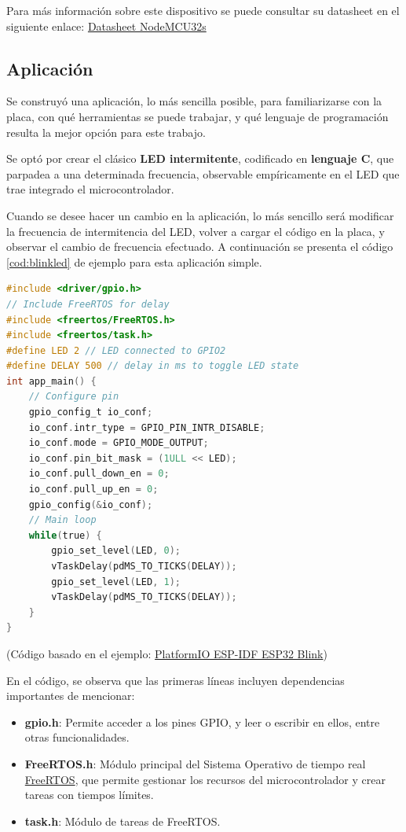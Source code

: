 Para más información sobre este dispositivo se puede consultar su datasheet en el siguiente enlace: \href{https://docs.ai-thinker.com/_media/esp32/docs/nodemcu-32s_product_specification.pdf}{Datasheet NodeMCU32s}

\subsection{Aplicación}
Se construyó una aplicación, lo más sencilla posible, para familiarizarse con la placa, con qué herramientas se puede trabajar, y qué lenguaje de programación resulta la mejor opción para este trabajo.

Se optó por crear el clásico \textbf{LED intermitente}, codificado en \textbf{lenguaje C}, que parpadea a una determinada frecuencia, observable empíricamente en el LED que trae integrado el microcontrolador. 

Cuando se desee hacer un cambio en la aplicación, lo más sencillo será modificar la frecuencia de intermitencia del LED, volver a cargar el código en la placa, y observar el cambio de frecuencia efectuado. A continuación se presenta el código \ref{cod:blinkled} de ejemplo para esta aplicación simple.

\newpage
\begin{lstlisting}[language=C, caption={BlinkLED}, label={cod:blinkled}, captionpos=b]
#include <driver/gpio.h>
// Include FreeRTOS for delay
#include <freertos/FreeRTOS.h>
#include <freertos/task.h>
#define LED 2 // LED connected to GPIO2
#define DELAY 500 // delay in ms to toggle LED state
int app_main() {
    // Configure pin
    gpio_config_t io_conf;
    io_conf.intr_type = GPIO_PIN_INTR_DISABLE;
    io_conf.mode = GPIO_MODE_OUTPUT;
    io_conf.pin_bit_mask = (1ULL << LED);
    io_conf.pull_down_en = 0;
    io_conf.pull_up_en = 0;
    gpio_config(&io_conf);
    // Main loop
    while(true) {
        gpio_set_level(LED, 0);
        vTaskDelay(pdMS_TO_TICKS(DELAY));
        gpio_set_level(LED, 1);
        vTaskDelay(pdMS_TO_TICKS(DELAY));
    }
}
\end{lstlisting}
(Código basado en el ejemplo: \href{https://techoverflow.net/2020/04/09/platformio-esp-idf-esp32-blink-example/}{PlatformIO ESP-IDF ESP32 Blink})

En el código, se observa que las primeras líneas incluyen dependencias importantes de mencionar:
\begin{itemize}
\item \textbf{gpio.h}: Permite acceder a los pines GPIO, y leer o escribir en ellos, entre otras funcionalidades.
\item \textbf{FreeRTOS.h}: Módulo principal del Sistema Operativo de tiempo real \href{https://www.freertos.org/}{FreeRTOS}, que permite gestionar los recursos del microcontrolador y crear tareas con tiempos límites.
\item \textbf{task.h}: Módulo de tareas de FreeRTOS.
\end{itemize}

